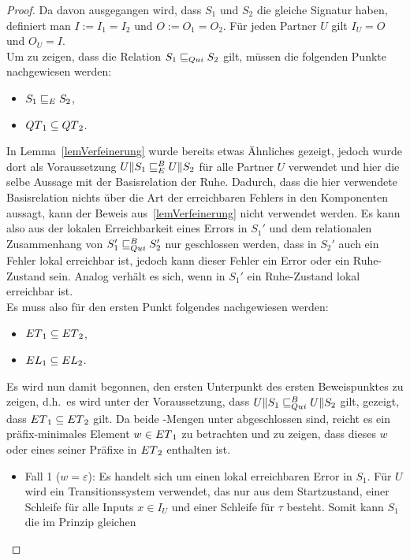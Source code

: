 \begin{proof}
  Da davon ausgegangen wird, dass $S_1$ und $S_2$ die gleiche Signatur haben,
  definiert man $I:=I_1=I_2$ und $O:=O_1=O_2$. Für jeden Partner $U$ gilt
  $I_U=O$ und $O_U=I$.\\
  Um zu zeigen, dass die Relation $S_1\sqsubseteq _{Qui} S_2$ gilt, müssen die
  folgenden Punkte nachgewiesen werden:
  \begin{itemize}
    \item $S_1\sqsubseteq _E S_2$,
    \item $QT{}_1\subseteq QT{}_2$.
  \end{itemize}
  In Lemma~\ref{lemVerfeinerung} wurde bereits etwas Ähnliches gezeigt, jedoch
  wurde dort als Voraussetzung $U\|S_1\sqsubseteq _E^B U\|S_2$ für alle Partner $U$
  verwendet und hier die selbe Aussage mit der Basisrelation der Ruhe. Dadurch,
  dass die hier verwendete Basisrelation nichts über die Art der erreichbaren
  Fehlers in den Komponenten aussagt, kann der Beweis aus~\ref{lemVerfeinerung}
  nicht verwendet werden. Es kann also aus der lokalen Erreichbarkeit eines
  Errors in $S_1'$ und dem relationalen Zusammenhang von $S_1'\sqsubseteq _{Qui}^B S_2'$ nur
  geschlossen werden, dass in $S_2'$ auch ein Fehler lokal erreichbar ist,
  jedoch kann dieser Fehler ein Error oder ein Ruhe-Zustand sein. Analog
  verhält es sich, wenn in $S_1'$ ein Ruhe-Zustand lokal erreichbar ist.\\
  Es muss also für den ersten Punkt folgendes nachgewiesen werden:
  \begin{itemize}
    \item $ET{}_1\subseteq ET{}_2$,
    \item $EL{}_1\subseteq EL{}_2$.
  \end{itemize}
  Es wird nun damit begonnen, den ersten Unterpunkt des ersten Beweispunktes zu
  zeigen, d.h.\ es wird unter der Voraussetzung, dass $U\|S_1\sqsubseteq _{Qui}^B U\|S_2$
  gilt, gezeigt, dass $ET{}_1\subseteq ET{}_2$ gilt. Da beide \ET{}-Mengen
  unter \cont{} abgeschlossen sind, reicht es ein präfix-minimales Element
  $w\in ET{}_1$ zu betrachten und zu zeigen, dass dieses $w$ oder eines seiner
  Präfixe in $ET{}_2$ enthalten ist.
  \begin{itemize}
    \item Fall 1 ($w=\varepsilon$): Es handelt sich um einen lokal erreichbaren
      Error in $S_1$. Für $U$ wird ein Transitionssystem verwendet, das nur aus
      dem Startzustand, einer Schleife für alle Inputs $x\in I_U$ und einer
      Schleife für $\tau$ besteht. Somit kann $S_1$ die im Prinzip gleichen

\end{itemize}
\end{proof}
